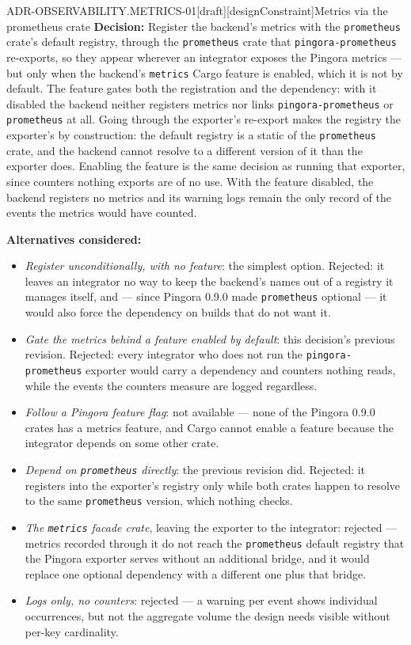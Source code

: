 \begin{requirement}{ADR-OBSERVABILITY.METRICS-01}[draft][designConstraint]{Metrics via the prometheus crate}
  \textbf{Decision:} Register the backend's metrics with the
  \texttt{prometheus} crate's default registry, through the
  \texttt{prometheus} crate that \texttt{pingora-prometheus} re-exports, so
  they appear wherever an integrator exposes the Pingora metrics --- but
  only when the backend's \texttt{metrics} Cargo feature is enabled, which it
  is not by default. The feature gates both the registration and the
  dependency: with it disabled the backend neither registers metrics nor
  links \texttt{pingora-prometheus} or \texttt{prometheus} at all. Going
  through the exporter's re-export makes the registry the exporter's by
  construction: the default registry is a static of the \texttt{prometheus}
  crate, and the backend cannot resolve to a different version of it than
  the exporter does. Enabling the feature is the same decision as running
  that exporter, since counters nothing exports are of no use. With the
  feature disabled, the backend registers no metrics and its warning logs
  remain the only record of the events the metrics would have counted.

  \textbf{Alternatives considered:}
  \begin{itemize}
    \item \emph{Register unconditionally, with no feature}: the simplest
      option. Rejected: it leaves an integrator no way to keep the backend's
      names out of a registry it manages itself, and --- since Pingora 0.9.0
      made \texttt{prometheus} optional --- it would also force the dependency
      on builds that do not want it.
    \item \emph{Gate the metrics behind a feature enabled by default}: this
      decision's previous revision. Rejected: every integrator who does not
      run the \texttt{pingora-prometheus} exporter would carry a dependency and
      counters nothing reads, while the events the counters measure are
      logged regardless.
    \item \emph{Follow a Pingora feature flag}: not available --- none of
      the Pingora 0.9.0 crates has a metrics feature, and Cargo cannot enable
      a feature because the integrator depends on some other crate.
    \item \emph{Depend on \texttt{prometheus} directly}: the previous
      revision did. Rejected: it registers into the exporter's registry only
      while both crates happen to resolve to the same \texttt{prometheus}
      version, which nothing checks.
    \item \emph{The \texttt{metrics} facade crate}, leaving the exporter to
      the integrator: rejected --- metrics recorded through it do not reach
      the \texttt{prometheus} default registry that the Pingora exporter
      serves without an additional bridge, and it would replace one optional
      dependency with a different one plus that bridge.
    \item \emph{Logs only, no counters}: rejected --- a warning per event
      shows individual occurrences, but not the aggregate volume the
      design needs visible without per-key cardinality.
  \end{itemize}


\end{requirement}
